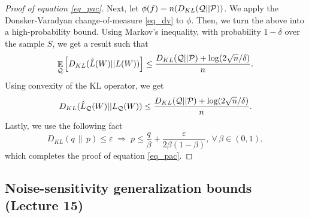 \begin{proof}[Proof of equation \eqref{eq_pac}]
Next, let $\phi(f) = n (D_{KL}( \mathcal{Q} || \mathcal{P} ))$.
We apply the Donsker-Varadyan change-of-measure \eqref{eq_dv} to $\phi$. %
Then, we turn the above into a high-probability bound. %
Using Markov's inequality, with probability $1-\delta$ over the sample $S$, we get a result such that
\[ \mathop{\mathbb{E}}_{\mathcal{Q}}\left[ D_{KL} (\hat L(W) || L (W))  \right] \le \frac { D_{KL}(\mathcal{Q} || \mathcal{P}) + \log( 2 \sqrt n / \delta) } n. \]
Using convexity of the KL operator, we get
\[ D_{KL} (\hat L_{\mathcal{Q}}(W) || L_{\mathcal{Q}}(W)) \le \frac { D_{KL}(\mathcal{Q} || \mathcal{P}) + \log( 2 \sqrt n / \delta) } n.  \]
Lastly, we use the following fact
\[ D_{{KL}}(q \,\|\, p) \le \varepsilon \;\Longrightarrow\; p \le \frac{q}{\beta} + \frac{\varepsilon}{2\beta(1-\beta)},~ \forall\,\beta \in (0,1), \]
which completes the proof of equation \eqref{eq_pac}.
\end{proof}

\subsection{Noise-sensitivity generalization bounds (Lecture 15)}

